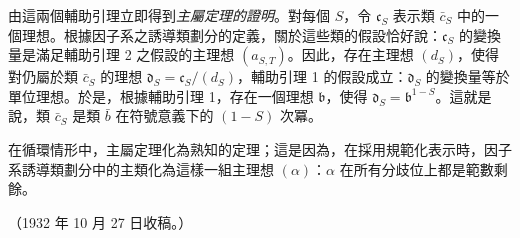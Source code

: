 \documentclass[11pt]{article}
\begin{document}
由這兩個輔助引理立即得到\emph{主屬定理的證明}。對每個 \(S\)，令 \(\mathfrak c_S\) 表示類 \(\bar c_S\) 中的一個理想。根據因子系之誘導類劃分的定義，關於這些類的假設恰好說：\(\mathfrak c_S\) 的變換量是滿足輔助引理 2 之假設的主理想 \((a_{S,T})\)。因此，存在主理想 \((d_S)\)，使得對仍屬於類 \(\bar c_S\) 的理想 \(\mathfrak d_S=\mathfrak c_S/(d_S)\)，輔助引理 1 的假設成立：\(\mathfrak d_S\) 的變換量等於單位理想。於是，根據輔助引理 1，存在一個理想 \(\mathfrak b\)，使得 \(\mathfrak d_S=\mathfrak b^{1-S}\)。這就是說，類 \(\bar c_S\) 是類 \(\bar b\) 在符號意義下的 \((1-S)\) 次冪。

在循環情形中，主屬定理化為熟知的定理；這是因為，在採用規範化表示時，因子系誘導類劃分中的主類化為這樣一組主理想 \((\alpha)\)：\(\alpha\) 在所有分歧位上都是範數剩餘。

\begin{center}
（1932 年 10 月 27 日收稿。）
\end{center}
\end{document}

